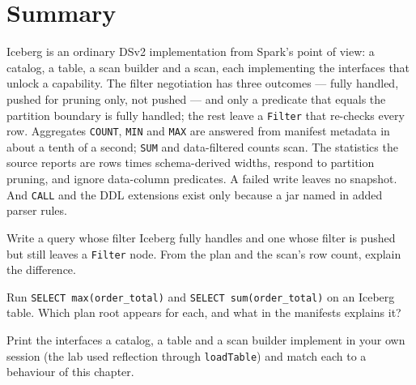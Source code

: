 \section{Summary}
\label{sec:dsv2-summary}

Iceberg is an ordinary DSv2 implementation from Spark's point of view: a catalog, a
table, a scan builder and a scan, each implementing the interfaces that unlock a
capability. The filter negotiation has three outcomes --- fully handled, pushed for
pruning only, not pushed --- and only a predicate that equals the partition boundary
is fully handled; the rest leave a \texttt{Filter} that re-checks every row.
Aggregates \texttt{COUNT}, \texttt{MIN} and \texttt{MAX} are answered from manifest
metadata in about a tenth of a second; \texttt{SUM} and data-filtered counts scan.
The statistics the source reports are rows times schema-derived widths, respond to
partition pruning, and ignore data-column predicates. A failed write leaves no
snapshot. And \texttt{CALL} and the DDL extensions exist only because a jar named in
 added parser rules.

\exercisehead
\begin{exercises}
\item Write a query whose filter Iceberg fully handles and one whose filter is
      pushed but still leaves a \texttt{Filter} node. From the plan and the scan's
      row count, explain the difference.
\item Run \texttt{SELECT max(order\_total)} and \texttt{SELECT sum(order\_total)}
      on an Iceberg table. Which plan root appears for each, and what in the
      manifests explains it?
\item Print the interfaces a catalog, a table and a scan builder implement in your
      own session (the lab used reflection through \texttt{loadTable}) and match each
      to a behaviour of this chapter.
\end{exercises}
